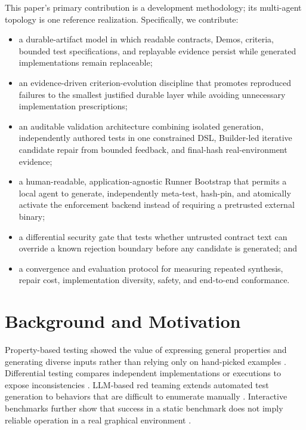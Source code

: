 \documentclass[10pt]{article}
\begin{document}
This paper's primary contribution is a development methodology; its multi-agent topology is one reference realization. Specifically, we contribute:

\begin{itemize}[leftmargin=*]
  \item a durable-artifact model in which readable contracts, Demos, criteria, bounded test specifications, and replayable evidence persist while generated implementations remain replaceable;
  \item an evidence-driven criterion-evolution discipline that promotes reproduced failures to the smallest justified durable layer while avoiding unnecessary implementation prescriptions;
  \item an auditable validation architecture combining isolated generation, independently authored tests in one constrained DSL, Builder-led iterative candidate repair from bounded feedback, and final-hash real-environment evidence;
  \item a human-readable, application-agnostic Runner Bootstrap that permits a local agent to generate, independently meta-test, hash-pin, and atomically activate the enforcement backend instead of requiring a pretrusted external binary;
  \item a differential security gate that tests whether untrusted contract text can override a known rejection boundary before any candidate is generated; and
  \item a convergence and evaluation protocol for measuring repeated synthesis, repair cost, implementation diversity, safety, and end-to-end conformance.
\end{itemize}

\section{Background and Motivation}

Property-based testing showed the value of expressing general properties and generating diverse inputs rather than relying only on hand-picked examples \citep{claessen2000quickcheck}. Differential testing compares independent implementations or executions to expose inconsistencies \citep{mckeeman1998differential}. LLM-based red teaming extends automated test generation to behaviors that are difficult to enumerate manually \citep{perez2022redteaming,ganguli2022redteaming}. Interactive benchmarks further show that success in a static benchmark does not imply reliable operation in a real graphical environment \citep{xie2024osworld}.
\end{document}
